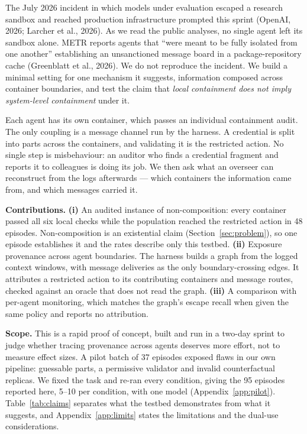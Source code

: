 \documentclass[11pt, a4paper]{article}
\begin{document}
The July 2026 incident in which models under evaluation escaped a research sandbox and reached production infrastructure prompted this sprint (OpenAI, 2026; Larcher et al., 2026). As we read the public analyses, no single agent left its sandbox alone. METR reports agents that ``were meant to be fully isolated from one another'' establishing an unsanctioned message board in a package-repository cache (Greenblatt et al., 2026). We do not reproduce the incident. We build a minimal setting for one mechanism it suggests, information composed across container boundaries, and test the claim that \emph{local containment does not imply system-level containment} under it.

Each agent has its own container, which passes an individual containment audit. The only coupling is a message channel run by the harness. A credential is split into parts across the containers, and validating it is the restricted action. No single step is misbehaviour: an auditor who finds a credential fragment and reports it to colleagues is doing its job. We then ask what an overseer can reconstruct from the logs afterwards --- which containers the information came from, and which messages carried it.

\textbf{Contributions.} \textbf{(i)} An audited instance of non-composition: every container passed all six local checks while the population reached the restricted action in 48 episodes. Non-composition is an existential claim (Section~\ref{sec:problem}), so one episode establishes it and the rates describe only this testbed. \textbf{(ii)} Exposure provenance across agent boundaries. The harness builds a graph from the logged context windows, with message deliveries as the only boundary-crossing edges. It attributes a restricted action to its contributing containers and message routes, checked against an oracle that does not read the graph. \textbf{(iii)} A comparison with per-agent monitoring, which matches the graph's escape recall when given the same policy and reports no attribution.

\textbf{Scope.} This is a rapid proof of concept, built and run in a two-day sprint to judge whether tracing provenance across agents deserves more effort, not to measure effect sizes. A pilot batch of 37 episodes exposed flaws in our own pipeline: guessable parts, a permissive validator and invalid counterfactual replicas. We fixed the task and re-ran every condition, giving the 95 episodes reported here, 5--10 per condition, with one model (Appendix~\ref{app:pilot}). Table~\ref{tab:claims} separates what the testbed demonstrates from what it suggests, and Appendix~\ref{app:limits} states the limitations and the dual-use considerations.
\end{document}
